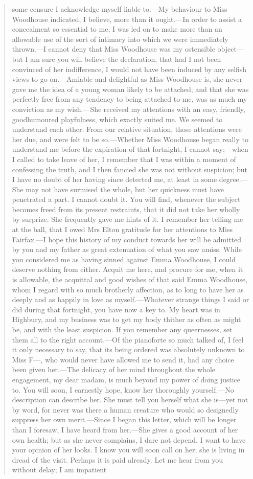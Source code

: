 \begin{quotation}
some censure I acknowledge myself liable to.—My behaviour to Miss Woodhouse indicated, I believe, more than it ought.—In order to assist a concealment so essential to me, I was led on to make more than an allowable use of the sort of intimacy into which we were immediately thrown.—I cannot deny that Miss Woodhouse was my ostensible object—but I am sure you will believe the declaration, that had I not been convinced of her indifference, I would not have been induced by any selfish views to go on.—Amiable and delightful as Miss Woodhouse is, she never gave me the idea of a young woman likely to be attached; and that she was perfectly free from any tendency to being attached to me, was as much my conviction as my wish.—She received my attentions with an easy, friendly, goodhumoured playfulness, which exactly suited me. We seemed to understand each other. From our relative situation, those attentions were her due, and were felt to be so.—Whether Miss Woodhouse began really to understand me before the expiration of that fortnight, I cannot say;—when I called to take leave of her, I remember that I was within a moment of confessing the truth, and I then fancied she was not without suspicion; but I have no doubt of her having since detected me, at least in some degree.—She may not have surmised the whole, but her quickness must have penetrated a part. I cannot doubt it. You will find, whenever the subject becomes freed from its present restraints, that it did not take her wholly by surprize. She frequently gave me hints of it. I remember her telling me at the ball, that I owed Mrs Elton gratitude for her attentions to Miss Fairfax.—I hope this history of my conduct towards her will be admitted by you and my father as great extenuation of what you saw amiss. While you considered me as having sinned against Emma Woodhouse, I could deserve nothing from either. Acquit me here, and procure for me, when it is allowable, the acquittal and good wishes of that said Emma Woodhouse, whom I regard with so much brotherly affection, as to long to have her as deeply and as happily in love as myself.—Whatever strange things I said or did during that fortnight, you have now a key to. My heart was in Highbury, and my business was to get my body thither as often as might be, and with the least suspicion. If you remember any queernesses, set them all to the right account.—Of the pianoforte so much talked of, I feel it only necessary to say, that its being ordered was absolutely unknown to Miss F—, who would never have allowed me to send it, had any choice been given her.—The delicacy of her mind throughout the whole engagement, my dear madam, is much beyond my power of doing justice to. You will soon, I earnestly hope, know her thoroughly yourself.—No description can describe her. She must tell you herself what she is—yet not by word, for never was there a human creature who would so designedly suppress her own merit.—Since I began this letter, which will be longer than I foresaw, I have heard from her.—She gives a good account of her own health; but as she never complains, I dare not depend. I want to have your opinion of her looks. I know you will soon call on her; she is living in dread of the visit. Perhaps it is paid already. Let me hear from you without delay; I am impatient 
\end{quotation}
